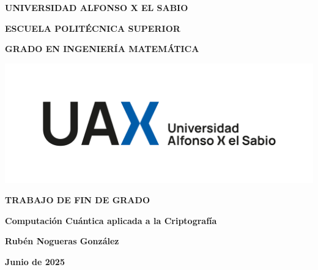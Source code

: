 \documentclass[12pt]{article}
\numberwithin{equation}{section} %
\begin{document}
    \parindent=0pt

    \begin{titlepage}
        \centering
        {\fontsize{18pt}{22pt}\selectfont \textbf{UNIVERSIDAD ALFONSO X EL SABIO}\par}
        \vspace{1cm}
        {\fontsize{16pt}{22pt}\selectfont \textbf{ESCUELA POLITÉCNICA SUPERIOR}\par}
        \vspace{1cm}
        {\fontsize{14pt}{22pt}\selectfont \textbf{GRADO EN INGENIERÍA MATEMÁTICA}\par}
        \vspace{2cm}
        {\includegraphics[width=1\textwidth]{img/portada.png}\par}
        \vspace{0.5cm}
        {\fontsize{20pt}{22pt}\selectfont \textbf{TRABAJO DE FIN DE GRADO}\par}
        \vspace{1cm}
        {\fontsize{14pt}{22pt}\selectfont \textbf{Computación Cuántica aplicada a la Criptografía}\par}
        \vfill
        {\fontsize{14pt}{22pt}\selectfont \textbf{Rubén Nogueras González}\par}
        \vspace{1cm}
        {\fontsize{14pt}{22pt}\selectfont \textbf{Junio de 2025}\par}
    \end{titlepage}
    
    \newpage
    \thispagestyle{empty}
    \mbox{}
    \newpage

    \tableofcontents

    \newpage
    \thispagestyle{empty}
    \mbox{}
    \newpage

    \listoffigures

    \newpage
    \thispagestyle{empty}
    \mbox{}
    \newpage
\end{document}
